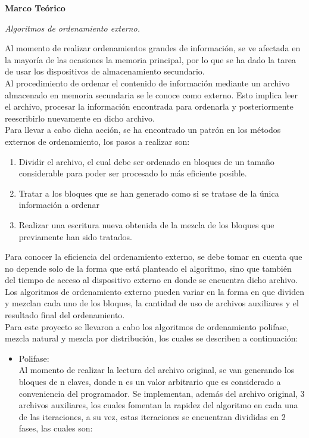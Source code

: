 \documentclass[12pt,letterpaper]{article}
\begin{document}
\LARGE\textbf{Marco Te\'orico}\par
\vspace{0.2cm}
\begin{large}
\noindent\textit{Algoritmos de ordenamiento externo.}\par
Al momento de realizar ordenamientos grandes de información, se ve afectada en la mayoría de las ocasiones la memoria principal, por lo que se ha dado la tarea de usar los dispositivos de almacenamiento secundario.\\ 
Al procedimiento de ordenar el contenido de información mediante un archivo almacenado en memoria secundaria se le conoce como externo. 
Esto implica leer el archivo, procesar la información encontrada para ordenarla y posteriormente reescribirlo nuevamente en dicho archivo.\\ Para llevar a cabo dicha acción, se ha encontrado un patrón en los métodos externos de ordenamiento, los pasos a realizar son:
\begin{enumerate}[noitemsep,topsep=0pt]
\item Dividir el archivo, el cual debe ser ordenado en bloques de un tamaño considerable para poder ser procesado lo más eficiente posible.
\item Tratar a los bloques que se han generado como si se tratase de la única información a ordenar
\item Realizar una escritura nueva obtenida de la mezcla de los bloques que previamente han sido tratados.
\end{enumerate}
Para conocer la eficiencia del ordenamiento externo, se debe tomar en cuenta que no depende solo de la forma que está planteado el algoritmo, sino que también del tiempo de acceso al dispositivo externo en donde se encuentra dicho archivo. \\
Los algoritmos de ordenamiento externo pueden variar en la forma en que dividen y mezclan cada uno de los bloques, la cantidad de uso de archivos auxiliares y el resultado final del ordenamiento.\\
Para este proyecto se llevaron a cabo los algoritmos de ordenamiento polifase, mezcla natural y mezcla por distribución, los cuales se describen a continuación:
\begin{itemize}
\item Polifase:\\
Al momento de realizar la lectura del archivo original, se van generando los bloques de n claves, donde n es un valor arbitrario que es considerado a conveniencia del programador. Se implementan, además del archivo original, 3 archivos auxiliares, los cuales fomentan la rapidez del algoritmo en cada una de las iteraciones, a su vez, estas iteraciones se encuentran divididas en 2 fases, las cuales son:\\

\end{itemize}
\end{large}
\end{document}
